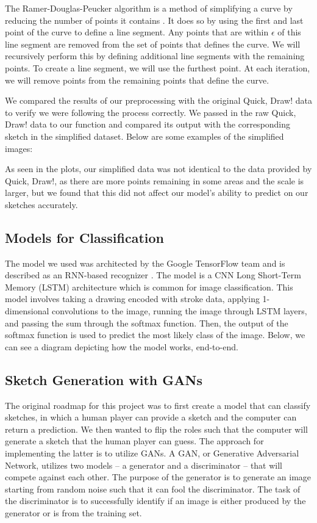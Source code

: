 \documentclass[10pt,twocolumn,letterpaper]{article}
\begin{document}
The Ramer-Douglas-Peucker algorithm is a method of simplifying a curve by reducing the number of points it contains \cite{RDP}. It does so by using the first and last point of the curve to define a line segment. Any points that are within $\epsilon$ of this line segment are removed from the set of points that defines the curve. We will recursively perform this by defining additional line segments with the remaining points. To create a line segment, we will use the furthest point. At each iteration, we will remove points from the remaining points that define the curve. 

We compared the results of our preprocessing with the original Quick, Draw! data to verify we were following the process correctly. We passed in the raw Quick, Draw! data to our function and compared its output with the corresponding sketch in the simplified dataset. Below are some examples of the simplified images:

As seen in the plots, our simplified data was not identical to the data provided by Quick, Draw!, as there are more points remaining in some areas and the scale is larger, but we found that this did not affect our model’s ability to predict on our sketches accurately. 

\subsection{Models for Classification}

The model we used was architected by the Google TensorFlow team and is described as an RNN-based recognizer \cite{tensorflow-architecture}. The model is a CNN Long Short-Term Memory (LSTM) architecture which is common for image classification. This model involves taking a drawing encoded with stroke data, applying 1-dimensional convolutions to the image, running the image through LSTM layers, and passing the sum through the softmax function. Then, the output of the softmax function is used to predict the most likely class of the image. Below, we can see a diagram depicting how the model works, end-to-end.

\subsection{Sketch Generation with GANs}

The original roadmap for this project was to first create a model that can classify sketches, in which a human player can provide a sketch and the computer can return a prediction. We then wanted to flip the roles such that the computer will generate a sketch that the human player can guess. The approach for implementing the latter is to utilize GANs. A GAN, or Generative Adversarial Network, utilizes two models – a generator and a discriminator – that will compete against each other. The purpose of the generator is to generate an image starting from random noise such that it can fool the discriminator. The task of the discriminator is to successfully identify if an image is either produced by the generator or is from the training set.
\end{document}
